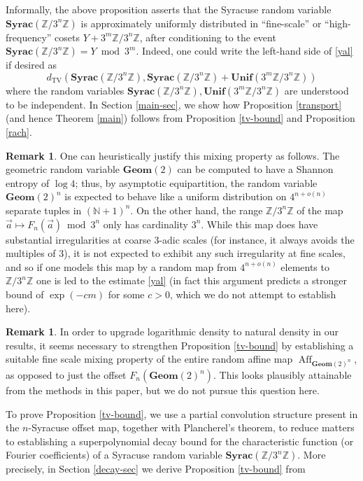 \documentclass[12pt,a4paper,reqno]{amsart}
\numberwithin{equation}{section}
\theoremstyle{plain}
\theoremstyle{definition}
\newtheorem{remark}[theorem]{Remark}
\newcommand\Z{\mathbb{Z}}
\newcommand\N{\mathbb{N}}
\newcommand\Unif{\mathbf{Unif}}
\newcommand\Geom{\mathbf{Geom}}
\newcommand\Syrac{\mathbf{Syrac}}
\newcommand\TV{{\operatorname{TV}}}
\newcommand\Aff{{\operatorname{Aff}}}
\renewcommand{\mod}{\bmod}
\begin{document}
Informally, the above proposition asserts that the Syracuse random variable $\Syrac(\Z/3^n\Z)$ is approximately uniformly distributed in ``fine-scale'' or ``high-frequency'' cosets $Y + 3^m\Z/3^n\Z$, after conditioning to the event $\Syrac(\Z/3^n\Z) = Y \mod 3^m$.  Indeed, one could write the left-hand side of \eqref{yal} if desired as
$$ d_{\TV}( \Syrac(\Z/3^n\Z), \Syrac(\Z/3^n\Z) + \Unif( 3^m\Z/3^n\Z) )$$
where the random variables $\Syrac(\Z/3^n\Z), \Unif( 3^m\Z/3^n\Z)$ are understood to be independent.  In Section \ref{main-sec}, we show how Proposition \ref{transport} (and hence Theorem \ref{main}) follows from Proposition \ref{tv-bound} and Proposition \ref{rach}.  

\begin{remark}  One can heuristically justify this mixing property as follows.  The geometric random variable $\Geom(2)$ can be computed to have a Shannon entropy of $\log 4$; thus, by asymptotic equipartition, the random variable $\Geom(2)^n$ is expected to behave like a uniform distribution on $4^{n+o(n)}$ separate tuples in $(\N+1)^n$.  On the other hand, the range $\Z/3^n\Z$ of the map $\vec a \mapsto F_n(\vec a) \mod 3^n$ only has cardinality $3^n$.  While this map does have substantial irregularities at coarse $3$-adic scales (for instance, it always avoids the multiples of $3$), it is not expected to exhibit any such irregularity at fine scales, and so if one models this map by a random map from $4^{n+o(n)}$ elements to $\Z/3^n\Z$ one is led to the estimate \eqref{yal} (in fact this argument predicts a stronger bound of $\exp( - cm )$ for some $c>0$, which we do not attempt to establish here).  
\end{remark}

\begin{remark}  In order to upgrade logarithmic density to natural density in our results, it seems necessary to strengthen Proposition \ref{tv-bound} by establishing a suitable fine scale mixing property of the entire random affine map $\Aff_{\Geom(2)^n}$, as opposed to just the offset $F_n(\Geom(2)^n)$.  This looks plausibly attainable from the methods in this paper, but we do not pursue this question here.
\end{remark}

To prove Proposition \ref{tv-bound}, we use a partial convolution structure present in the $n$-Syracuse offset map, together with Plancherel's theorem, to reduce matters to establishing a superpolynomial decay bound for the characteristic function (or Fourier coefficients) of a Syracuse random variable $\Syrac(\Z/3^n\Z)$.  More precisely, in Section \ref{decay-sec} we derive Proposition \ref{tv-bound} from
\end{document}
